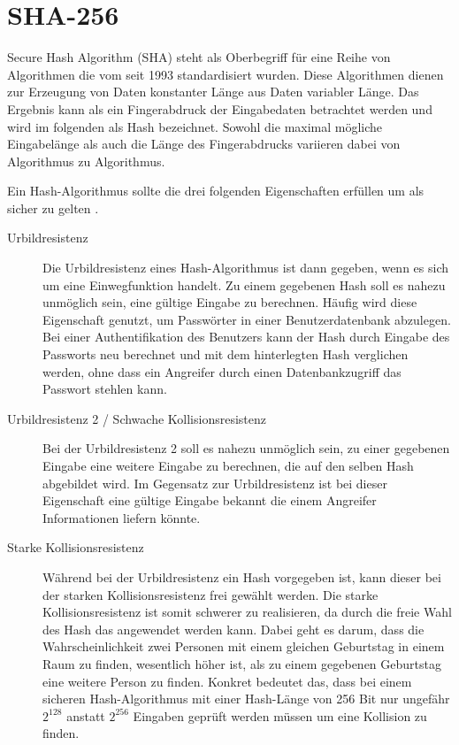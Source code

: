 \chapter{SHA-256}
\label{chp:sha256}

Secure Hash Algorithm (SHA) steht als Oberbegriff für eine Reihe von Algorithmen die vom  seit 1993 standardisiert wurden.
Diese Algorithmen dienen zur Erzeugung von Daten konstanter Länge aus Daten variabler Länge.
Das Ergebnis kann als ein Fingerabdruck der Eingabedaten betrachtet werden und wird im folgenden als Hash bezeichnet.
Sowohl die maximal mögliche Eingabelänge als auch die Länge des Fingerabdrucks variieren dabei von Algorithmus zu Algorithmus.

Ein Hash-Algorithmus sollte die drei folgenden Eigenschaften erfüllen um als sicher zu gelten \cite{crypto1}.
\begin{description}
  \item[Urbildresistenz] Die Urbildresistenz eines Hash-Algorithmus ist dann gegeben, wenn es sich um eine Einwegfunktion handelt.
                         Zu einem gegebenen Hash soll es nahezu unmöglich sein, eine gültige Eingabe zu berechnen.
                         Häufig wird diese Eigenschaft genutzt, um Passwörter in einer Benutzerdatenbank abzulegen.
                         Bei einer Authentifikation des Benutzers kann der Hash durch Eingabe des Passworts neu berechnet und mit dem 
                         hinterlegten Hash verglichen werden, ohne dass ein Angreifer durch einen Datenbankzugriff das Passwort stehlen kann.
  \item[Urbildresistenz 2 / Schwache Kollisionsresistenz]
                         Bei der Urbildresistenz 2 soll es nahezu unmöglich sein, zu einer gegebenen Eingabe eine weitere Eingabe zu berechnen,
                         die auf den selben Hash abgebildet wird. Im Gegensatz zur Urbildresistenz ist bei dieser Eigenschaft eine gültige
                         Eingabe bekannt die einem Angreifer Informationen liefern könnte.
  \item[Starke Kollisionsresistenz]
                         Während bei der Urbildresistenz ein Hash vorgegeben ist, kann dieser bei der starken Kollisionsresistenz frei gewählt werden.
                         Die starke Kollisionsresistenz ist somit schwerer zu realisieren, da durch die freie Wahl des Hash das 
                         angewendet werden kann. Dabei geht es darum, dass die Wahrscheinlichkeit zwei Personen mit einem gleichen Geburtstag in einem Raum
                         zu finden, wesentlich höher ist, als zu einem gegebenen Geburtstag eine weitere Person zu finden. Konkret bedeutet das, dass
                         bei einem sicheren Hash-Algorithmus mit einer Hash-Länge von 256 Bit nur ungefähr $ 2^{128} $ anstatt $ 2^{256} $ Eingaben geprüft werden
                         müssen um eine Kollision zu finden.                         
\end{description}


